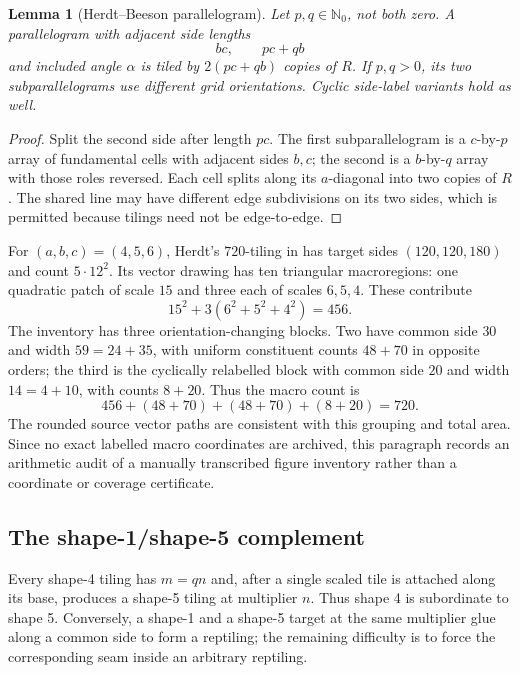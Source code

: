 \documentclass[11pt]{amsart}
\newtheorem{lemma}[theorem]{Lemma}
\theoremstyle{definition}
\theoremstyle{remark}
\newcommand{\Nzero}{\mathbb N_0}
\begin{document}
\begin{lemma}[Herdt--Beeson parallelogram]\label{lem:orientationblock}
Let $p,q\in\Nzero$, not both zero.  A parallelogram with adjacent side
lengths
\[
                         bc,\qquad pc+qb
\]
and included angle $\alpha$ is tiled by $2(pc+qb)$ copies of $R$.  If
$p,q>0$, its two subparallelograms use different grid orientations.  Cyclic
side-label variants hold as well.
\end{lemma}

\begin{proof}
Split the second side after length $pc$.  The first subparallelogram is a
$c$-by-$p$ array of fundamental cells with adjacent sides $b,c$; the second
is a $b$-by-$q$ array with those roles reversed.  Each cell splits along its
$a$-diagonal into two copies of $R$.  The shared line may have different
edge subdivisions on its two sides, which is permitted because tilings need
not be edge-to-edge.
\end{proof}

For $(a,b,c)=(4,5,6)$, Herdt's $720$-tiling in
\cite[Fig.~24]{BeesonIso} has target sides $(120,120,180)$ and count
$5\cdot12^2$.  Its vector drawing has ten triangular macroregions: one
quadratic patch of scale $15$ and three each of scales $6,5,4$.  These
contribute
\[
                  15^2+3(6^2+5^2+4^2)=456.
\]
The inventory has three orientation-changing blocks.  Two have common
side $30$ and width $59=24+35$, with uniform constituent counts
$48+70$ in opposite orders; the third is the cyclically relabelled block
with common side $20$ and width $14=4+10$, with counts $8+20$.
Thus the macro count is
\[
              456+(48+70)+(48+70)+(8+20)=720.
\]
The rounded source vector paths are consistent with this grouping and total
area.  Since no exact labelled macro coordinates are archived, this paragraph
records an arithmetic audit of a manually transcribed figure inventory rather
than a coordinate or coverage certificate.

\subsection{The shape-1/shape-5 complement}

Every shape-4 tiling has $m=qn$ and, after a single scaled tile is attached
along its base, produces a shape-5 tiling at multiplier $n$.  Thus shape 4
is subordinate to shape 5.  Conversely, a shape-1 and a shape-5 target at
the same multiplier glue along a common side to form a reptiling; the
remaining difficulty is to force the corresponding seam inside an arbitrary
reptiling.
\end{document}
